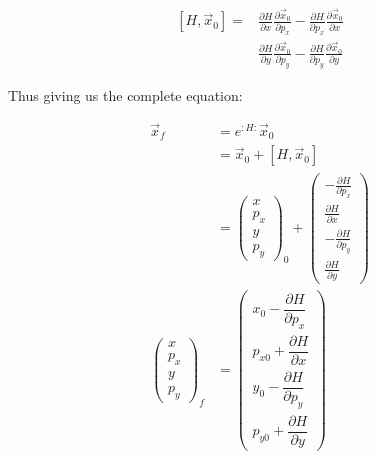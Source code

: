 \begin{equation}
\begin{aligned}
\left[H, \vec{x}_0\right] =& \frac{\partial H}{\partial x} \frac{\partial \vec{x}_0}{\partial p_x} 
                                    -\frac{\partial H}{\partial p_x} \frac{\partial \vec{x}_0}{\partial x} \\
                           &\frac{\partial H}{\partial y} \frac{\partial \vec{x}_0}{\partial p_y} 
                                    -\frac{\partial H}{\partial p_y} \frac{\partial \vec{x}_0}{\partial y}
\end{aligned}
\label{eq:bracket_hamiltonian}\end{equation}

Thus giving us the complete equation:

\begin{equation}
\begin{aligned}
\vec{x}_f &= e^{:H:}\vec{x}_0 \\
          &= \vec{x}_0 + \left[H, \vec{x}_0\right] \\
          &= \begin{pmatrix} x \\ p_x \\ y \\ p_y\end{pmatrix}_0
             + \begin{pmatrix} -\frac{\partial H}{\partial p_x} \\ 
                               \frac{\partial H}{\partial x} \\
                               -\frac{\partial H}{\partial p_y} \\
                               \frac{\partial H}{\partial y}
               \end{pmatrix} \\
\begin{pmatrix} x \\ 
                p_{x} \\
                y \\
                p_{y} 
\end{pmatrix}_f
          &=  \begin{pmatrix} x_0 - \dfrac{\partial H}{\partial p_x} \\ 
                               p_{x0} +\dfrac{\partial H}{\partial x} \\
                               y_0 - \dfrac{\partial H}{\partial p_y} \\
                               p_{y0} +\dfrac{\partial H}{\partial y}
               \end{pmatrix}
\end{aligned}
\label{eq:non_linear_map}\end{equation}

